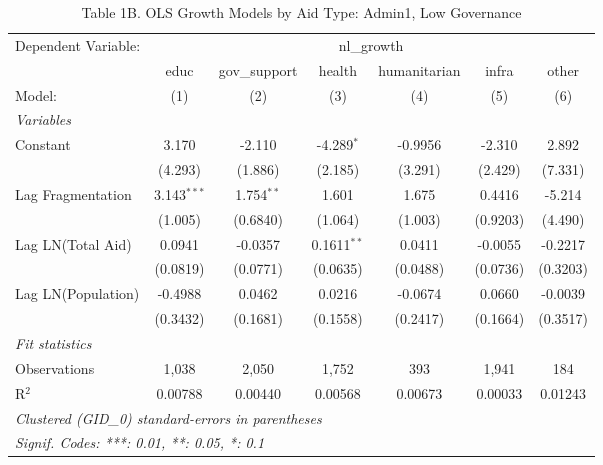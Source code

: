 \begin{table}[htbp]
   \caption{Table 1B. OLS Growth Models by Aid Type: Admin1, Low Governance}
   \centering
   \begin{tabular}{lcccccc}
      \tabularnewline \midrule \midrule
      Dependent Variable: & \multicolumn{6}{c}{nl\_growth}\\
                         & educ          & gov\_support  & health        & humanitarian & infra    & other \\   
      Model:             & (1)           & (2)           & (3)           & (4)          & (5)      & (6)\\  
      \midrule
      \emph{Variables}\\
      Constant           & 3.170         & -2.110        & -4.289$^{*}$  & -0.9956      & -2.310   & 2.892\\   
                         & (4.293)       & (1.886)       & (2.185)       & (3.291)      & (2.429)  & (7.331)\\   
      Lag Fragmentation  & 3.143$^{***}$ & 1.754$^{**}$  & 1.601         & 1.675        & 0.4416   & -5.214\\   
                         & (1.005)       & (0.6840)      & (1.064)       & (1.003)      & (0.9203) & (4.490)\\   
      Lag LN(Total Aid)  & 0.0941        & -0.0357       & 0.1611$^{**}$ & 0.0411       & -0.0055  & -0.2217\\   
                         & (0.0819)      & (0.0771)      & (0.0635)      & (0.0488)     & (0.0736) & (0.3203)\\   
      Lag LN(Population) & -0.4988       & 0.0462        & 0.0216        & -0.0674      & 0.0660   & -0.0039\\   
                         & (0.3432)      & (0.1681)      & (0.1558)      & (0.2417)     & (0.1664) & (0.3517)\\   
      \midrule
      \emph{Fit statistics}\\
      Observations       & 1,038         & 2,050         & 1,752         & 393          & 1,941    & 184\\  
      R$^2$              & 0.00788       & 0.00440       & 0.00568       & 0.00673      & 0.00033  & 0.01243\\  
      \midrule \midrule
      \multicolumn{7}{l}{\emph{Clustered (GID\_0) standard-errors in parentheses}}\\
      \multicolumn{7}{l}{\emph{Signif. Codes: ***: 0.01, **: 0.05, *: 0.1}}\\
   \end{tabular}
\end{table}



